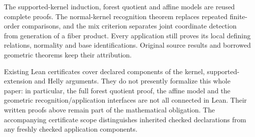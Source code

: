 The supported-kernel induction, forest quotient and affine models are
reused complete proofs. The normal-kernel recognition theorem replaces
repeated finite-order comparisons, and the mix criterion separates joint
coordinate detection from generation of a fiber product. Every application
still proves its local defining relations, normality and base identifications.
Original source results and borrowed geometric theorems keep their attribution.

Existing Lean certificates cover declared components of the kernel,
supported-extension and Helly arguments. They do not presently formalize
this whole paper: in particular, the full forest quotient proof, the
affine model and the geometric recognition/application interfaces are
not all connected in Lean. Their written proofs above remain part of the
mathematical obligation. The accompanying certificate scope
distinguishes inherited checked declarations from any freshly checked
application components.
